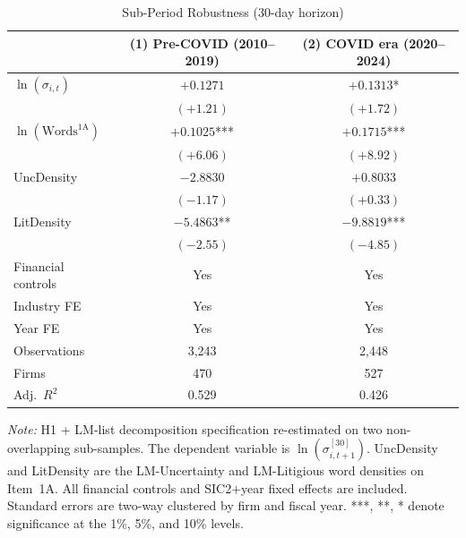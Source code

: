 \begin{table}[htbp]
\centering
\caption{Sub-Period Robustness (30-day horizon)}
\label{tab:subperiod}
\begin{tabular}{lcc}
\toprule
 & (1) Pre-COVID (2010--2019) & (2) COVID era (2020--2024) \\
\midrule
$\ln(\sigma_{i,t})$ & $+0.1271$ & $+0.1313$* \\
 & $(+1.21)$ & $(+1.72)$ \\[4pt]
$\ln(\text{Words}^{\text{1A}})$ & $+0.1025$*** & $+0.1715$*** \\
 & $(+6.06)$ & $(+8.92)$ \\[4pt]
UncDensity & $-2.8830$ & $+0.8033$ \\
 & $(-1.17)$ & $(+0.33)$ \\[4pt]
LitDensity & $-5.4863$** & $-9.8819$*** \\
 & $(-2.55)$ & $(-4.85)$ \\[4pt]
\midrule
Financial controls & Yes & Yes \\
Industry FE & Yes & Yes \\
Year FE & Yes & Yes \\
Observations & 3,243 & 2,448 \\
Firms & 470 & 527 \\
Adj.\ $R^2$ & 0.529 & 0.426 \\
\bottomrule
\end{tabular}
\par\smallskip
\begin{flushleft}\footnotesize
\textit{Note:} H1 + LM-list decomposition specification re-estimated on two non-overlapping sub-samples. The dependent variable is $\ln(\sigma_{i,t+1}^{[30]})$. UncDensity and LitDensity are the LM-Uncertainty and LM-Litigious word densities on Item~1A. All financial controls and SIC2$+$year fixed effects are included. Standard errors are two-way clustered by firm and fiscal year. ***, **, * denote significance at the 1\%, 5\%, and 10\% levels.
\end{flushleft}
\end{table}